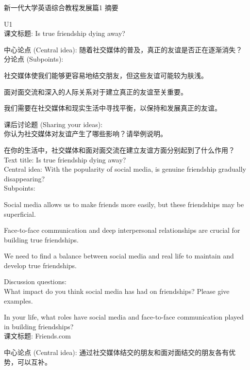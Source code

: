 \documentclass[a4paper,UTF8]{article}
\begin{document}
\begin{center}
	{\huge 新一代大学英语综合教程发展篇1 摘要}
\end{center}


U1\\

课文标题: Is true friendship dying away?

中心论点 (Central idea): 随着社交媒体的普及，真正的友谊是否正在逐渐消失？\\

分论点 (Subpoints):

社交媒体使我们能够更容易地结交朋友，但这些友谊可能较为肤浅。

面对面交流和深入的人际关系对于建立真正的友谊至关重要。

我们需要在社交媒体和现实生活中寻找平衡，以保持和发展真正的友谊。

课后讨论题 (Sharing your ideas):\\

你认为社交媒体对友谊产生了哪些影响？请举例说明。

在你的生活中，社交媒体和面对面交流在建立友谊方面分别起到了什么作用？\\

Text title: Is true friendship dying away?\\

Central idea: With the popularity of social media, is genuine friendship gradually disappearing?\\

Subpoints:

Social media allows us to make friends more easily, but these friendships may be superficial.

Face-to-face communication and deep interpersonal relationships are crucial for building true friendships.

We need to find a balance between social media and real life to maintain and develop true friendships.

Discussion questions:\\

What impact do you think social media has had on friendships? Please give examples.

In your life, what roles have social media and face-to-face communication played in building friendships?\\

课文标题: Friends.com

中心论点 (Central idea): 通过社交媒体结交的朋友和面对面结交的朋友各有优势，可以互补。\\
\end{document}
